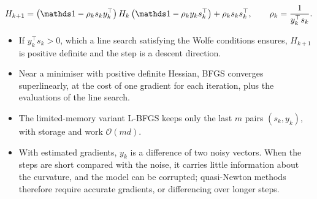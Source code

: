\documentclass[handoutsbeamer.tex]{subfiles}
\begin{document}
\begin{frame}
\onp{\footnotesize}
\begin{equation}\label{eq:ch06:bfgs}
    H_{k+1} = \big(\one - \rho_k s_ky_k^\top\big)\,H_k\,\big(\one - \rho_k y_ks_k^\top\big) + \rho_k s_ks_k^\top,\qquad \rho_k = \frac1{y_k^\top s_k}.
\end{equation}
\begin{itemize}\setlength\itemsep{0.2em}
    \item If $y_k^\top s_k>0$, which a line search satisfying the Wolfe conditions ensures, $H_{k+1}$ is positive definite and the step is a descent direction.
    \item Near a minimiser with positive definite Hessian, BFGS converges superlinearly, at the cost of one gradient for each iteration, plus the evaluations of the line search.
    \item The limited-memory variant L-BFGS keeps only the last $m$ pairs $(s_k,y_k)$, with storage and work $\mathcal O(md)$.
    \item With estimated gradients, $y_k$ is a difference of two noisy vectors. When the steps are short compared with the noise, it carries little information about the curvature, and the model can be corrupted; quasi-Newton methods therefore require accurate gradients, or differencing over longer steps.
\end{itemize}
\end{frame}
\end{document}
